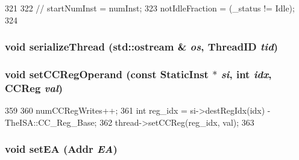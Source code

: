 \begin{DoxyCode}
321 {
322 //    startNumInst = numInst;
323      notIdleFraction = (_status != Idle);
324 }
\end{DoxyCode}
\hypertarget{classBaseSimpleCPU_a688ca491f5419c29fb81f8235ba1dc13}{
\subsubsection[{serializeThread}]{\setlength{\rightskip}{0pt plus 5cm}void serializeThread (std::ostream \& {\em os}, \/  {\bf ThreadID} {\em tid})}}
\label{classBaseSimpleCPU_a688ca491f5419c29fb81f8235ba1dc13}
\hypertarget{classBaseSimpleCPU_a859133f9c66c7b72cb02ff58e8385b52}{
\subsubsection[{setCCRegOperand}]{\setlength{\rightskip}{0pt plus 5cm}void setCCRegOperand (const {\bf StaticInst} $\ast$ {\em si}, \/  int {\em idx}, \/  {\bf CCReg} {\em val})}}
\label{classBaseSimpleCPU_a859133f9c66c7b72cb02ff58e8385b52}



\begin{DoxyCode}
359     {
360         numCCRegWrites++;
361         int reg_idx = si->destRegIdx(idx) - TheISA::CC_Reg_Base;
362         thread->setCCReg(reg_idx, val);
363     }
\end{DoxyCode}
\hypertarget{classBaseSimpleCPU_a2f9742f8d2bcf6a31ebfc121fd9d5fbc}{
\subsubsection[{setEA}]{\setlength{\rightskip}{0pt plus 5cm}void setEA ({\bf Addr} {\em EA})}}
\label{classBaseSimpleCPU_a2f9742f8d2bcf6a31ebfc121fd9d5fbc}



